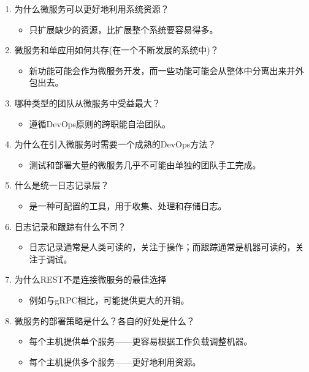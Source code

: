 \begin{enumerate}
\item
为什么微服务可以更好地利用系统资源？
\begin{itemize}
\item 
只扩展缺少的资源，比扩展整个系统要容易得多。
\end{itemize}

\item
微服务和单应用如何共存(在一个不断发展的系统中)？
\begin{itemize}
\item 
新功能可能会作为微服务开发，而一些功能可能会从整体中分离出来并外包出去。
\end{itemize}

\item
哪种类型的团队从微服务中受益最大？
\begin{itemize}
\item 
遵循DevOps原则的跨职能自治团队。
\end{itemize}

\item
为什么在引入微服务时需要一个成熟的DevOps方法？
\begin{itemize}
\item 
测试和部署大量的微服务几乎不可能由单独的团队手工完成。
\end{itemize}

\item
什么是统一日志记录层？
\begin{itemize}
\item 
是一种可配置的工具，用于收集、处理和存储日志。
\end{itemize}

\item
日志记录和跟踪有什么不同？
\begin{itemize}
\item 
日志记录通常是人类可读的，关注于操作；而跟踪通常是机器可读的，关注于调试。
\end{itemize}

\item
为什么REST不是连接微服务的最佳选择
\begin{itemize}
\item 
例如与gRPC相比，可能提供更大的开销。
\end{itemize}

\item
微服务的部署策略是什么？各自的好处是什么？
\begin{itemize}
\item 
每个主机提供单个服务——更容易根据工作负载调整机器。

\item 
每个主机提供多个服务——更好地利用资源。
\end{itemize}
\end{enumerate}